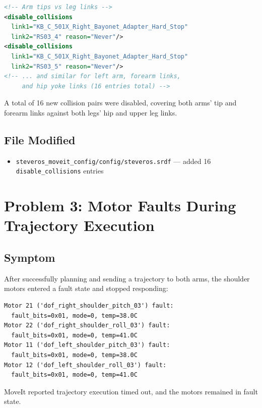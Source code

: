 \documentclass[11pt,a4paper]{article}
\begin{document}
\begin{lstlisting}[language=XML]
<!-- Arm tips vs leg links -->
<disable_collisions
  link1="KB_C_501X_Right_Bayonet_Adapter_Hard_Stop"
  link2="RS03_4" reason="Never"/>
<disable_collisions
  link1="KB_C_501X_Right_Bayonet_Adapter_Hard_Stop"
  link2="RS03_5" reason="Never"/>
<!-- ... and similar for left arm, forearm links,
     and hip yoke links (16 entries total) -->
\end{lstlisting}

A total of 16 new collision pairs were disabled, covering both arms' tip and forearm
links against both legs' hip and upper leg links.

\subsection{File Modified}
\begin{itemize}
  \item \texttt{steveros\_moveit\_config/config/steveros.srdf} --- added 16 \texttt{disable\_collisions} entries
\end{itemize}

\section{Problem 3: Motor Faults During Trajectory Execution}

\subsection{Symptom}
After successfully planning and sending a trajectory to both arms, the shoulder motors
entered a fault state and stopped responding:

\begin{lstlisting}[language={}]
Motor 21 ('dof_right_shoulder_pitch_03') fault:
  fault_bits=0x01, mode=0, temp=38.0C
Motor 22 ('dof_right_shoulder_roll_03') fault:
  fault_bits=0x01, mode=0, temp=41.0C
Motor 11 ('dof_left_shoulder_pitch_03') fault:
  fault_bits=0x01, mode=0, temp=38.0C
Motor 12 ('dof_left_shoulder_roll_03') fault:
  fault_bits=0x01, mode=0, temp=41.0C
\end{lstlisting}

MoveIt reported trajectory execution timed out, and the motors remained in fault state.
\end{document}
